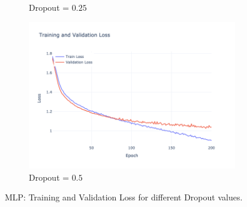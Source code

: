 \begin{figure}[htbp!]
\begin{subfigure}{0.32\textwidth}
        \caption{Dropout = $0.25$}
    \end{subfigure}
    \begin{subfigure}{0.32\textwidth}
        \centering
        \includegraphics[width=\textwidth]{images/mlp-training-validation-loss-batch-64-lr-0.002-epochs-200-hidden-200-dropout-0.5-l2-0.0-layers-2-act-relu-opt-sgd-mom-0.0.png}
        \caption{Dropout = $0.5$}
    \end{subfigure}
    \caption{MLP: Training and Validation Loss for different Dropout values.}
    \label{fig:mlp_dropout_loss}
\end{figure}

